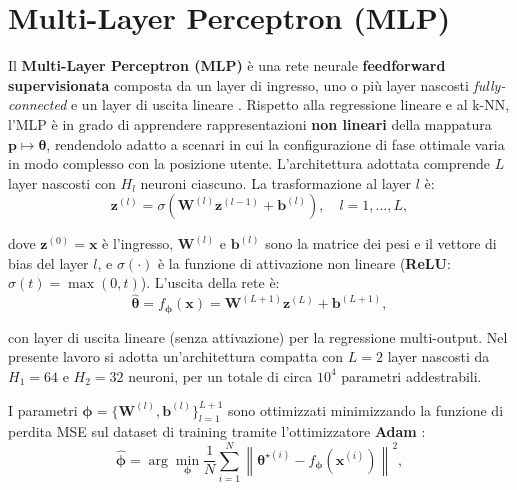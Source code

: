 \documentclass[12pt,a4paper]{report}
\begin{document}
\newpage
\section{Multi-Layer Perceptron (MLP)}
Il \textbf{Multi-Layer Perceptron (MLP)} è una rete neurale
\textbf{feedforward supervisionata} composta da un layer di ingresso,
uno o più layer nascosti \emph{fully-connected} e un layer di uscita
lineare \cite{goodfellow2016dl}. Rispetto alla regressione lineare e
al k-NN, l'MLP è in grado di apprendere rappresentazioni \textbf{non
lineari} della mappatura $\mathbf{p} \mapsto \boldsymbol{\theta}$,
rendendolo adatto a scenari in cui la configurazione di fase ottimale
varia in modo complesso con la posizione utente. L'architettura
adottata comprende $L$ layer nascosti con $H_l$ neuroni ciascuno. La
trasformazione al layer $l$ è:
\begin{equation}
  \mathbf{z}^{(l)} = \sigma\!\left(\mathbf{W}^{(l)}\mathbf{z}^{(l-1)}
  + \mathbf{b}^{(l)}\right), \quad l = 1, \dots, L,
  \label{eq:mlp_layer}
\end{equation}

dove $\mathbf{z}^{(0)} = \mathbf{x}$ è l'ingresso, $\mathbf{W}^{(l)}$
e $\mathbf{b}^{(l)}$ sono la matrice dei pesi e il vettore di bias
del layer $l$, e $\sigma(\cdot)$ è la funzione di attivazione non
lineare (\textbf{ReLU}: $\sigma(t) = \max(0, t)$). L'uscita della rete è:
\begin{equation}
  \hat{\boldsymbol{\theta}} = f_{\boldsymbol{\phi}}(\mathbf{x}) =
  \mathbf{W}^{(L+1)}\mathbf{z}^{(L)} + \mathbf{b}^{(L+1)},
  \label{eq:mlp_output}
\end{equation}

con layer di uscita lineare (senza attivazione) per la regressione
multi-output. Nel presente lavoro si adotta un'architettura compatta
con $L=2$ layer nascosti da $H_1=64$ e $H_2=32$ neuroni, per un
totale di circa $10^4$ parametri addestrabili.

\noindent I parametri $\boldsymbol{\phi} = \{\mathbf{W}^{(l)},
\mathbf{b}^{(l)}\}_{l=1}^{L+1}$ sono ottimizzati minimizzando la
funzione di perdita MSE sul dataset di training tramite
l'ottimizzatore \textbf{Adam} \cite{goodfellow2016dl}:
\begin{equation}
  \hat{\boldsymbol{\phi}} =
  \arg\min_{\boldsymbol{\phi}}
  \frac{1}{N}\sum_{i=1}^{N}
  \left\|\boldsymbol{\theta}^{\star(i)} -
  f_{\boldsymbol{\phi}}\!\left(\mathbf{x}^{(i)}\right)\right\|^2,
  \label{eq:mlp_loss}
\end{equation}
\end{document}
